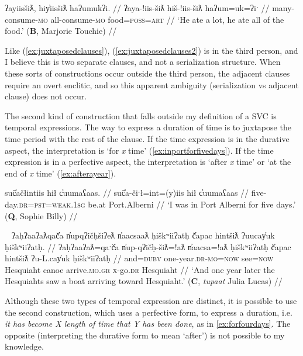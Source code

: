 \ex \label{ex:juxtaposedclauses2}
\begingl
\glpreamble ʔayiisšiƛ, hiy̓iisšiƛ haʔumukʔi. //
\gla ʔaya-!iis-šiƛ hiš-!iis-šiƛ haʔum=uk=ʔiˑ //
\glb many-consume-\textsc{mo} all-consume-\textsc{mo} food=\textsc{poss}=\textsc{art} //
\glft `He ate a lot, he ate all of the food.' (\textbf{B}, Marjorie Touchie) //
\endgl
\xe

Like (\ref{ex:juxtaposedclauses}), (\ref{ex:juxtaposedclauses2}) is in the third person, and I believe this is two separate clauses, and not a serialization structure. When these sorts of constructions occur outside the third person, the adjacent clauses require an overt enclitic, and so this apparent ambiguity (serialization vs adjacent clause) does not occur.

The second kind of construction that falls outside my definition of a SVC is temporal expressions. The way to express a duration of time is to juxtapose the time period with the rest of the clause. If the time expression is in the durative aspect, the interpretation is `for \textit{x} time' (\ref{ex:inportforfivedays}). If the time expression is in a perfective aspect, the interpretation is `after \textit{x} time' or `at the end of \textit{x} time' (\ref{ex:afterayear}).

\ex \label{ex:inportforfivedays}
\begingl
\glpreamble suč̓ačłintiis hił c̓uumaʕaas. //
\gla suč̓a-čiˑł=int=(y)iis hił c̓uumaʕaas //
\glb five-day.\textsc{dr}=\textsc{pst}=\textsc{weak.1sg} be.at Port.Alberni //
\glft `I was in Port Alberni for five days.' (\textbf{Q}, Sophie Billy) //
\endgl
\xe

\ex~ \label{ex:afterayear}
\begingl
\glpreamble ʔaḥʔaaʔaƛqač̓a n̓upqʔičḥšiʔeƛ n̓aacsaaƛ ḥiškʷiiʔatḥ č̓apac hintšiƛ ʔuucay̓uk ḥiškʷiiʔatḥ. //
\gla ʔaḥʔaaʔaƛ=qaˑč̓a n̓up-qʔičḥ-šiƛ=!aƛ n̓aacsa=!aƛ ḥiškʷiiʔatḥ č̓apac hintšiƛ ʔu-L.cay̓uk ḥiškʷiiʔatḥ //
\glb and=\textsc{dubv} one-year.\textsc{dr}-\textsc{mo}=\textsc{now} see=\textsc{now} Hesquiaht canoe arrive.\textsc{mo}.\textsc{gr} \textsc{x}-go.\textsc{dr} Hesquiaht //
\glft `And one year later the Hesquiahts saw a boat arriving toward Hesquiaht.' (\textbf{C}, \textit{tupaat} Julia Lucas) //
\endgl
\xe

Although these two types of temporal expression are distinct, it is possible to use the second construction, which uses a perfective form, to express a duration, i.e. \textit{it has become X length of time that Y has been done}, as in \ref{ex:forfourdays}. The opposite (interpreting the durative form to mean `after') is not possible to my knowledge.

